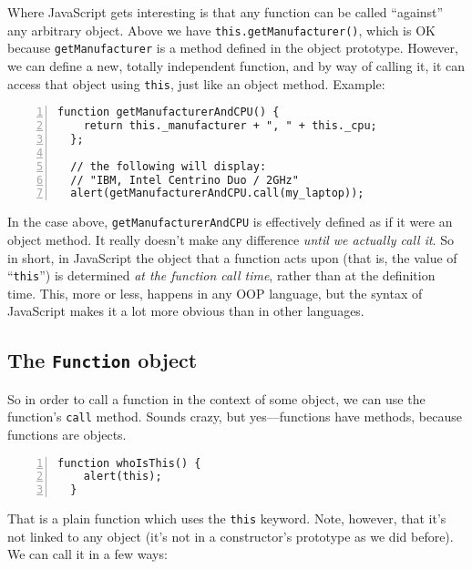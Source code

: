 Where JavaScript gets interesting is that any function can be called “against”
any arbitrary object.  Above we have \lstinline{this.getManufacturer()}, which
is OK because \lstinline{getManufacturer} is a method defined in the object
prototype.  However, we can define a new, totally independent function, and by
way of calling it, it can access that object using \lstinline{this}, just like
an object method.  Example:

\begin{lstlisting}[nolol,name=ObjectSample1,numbers=left]
  function getManufacturerAndCPU() {
    return this._manufacturer + ", " + this._cpu;
  };

  // the following will display:
  // "IBM, Intel Centrino Duo / 2GHz"
  alert(getManufacturerAndCPU.call(my_laptop));
\end{lstlisting}

In the case above, \lstinline{getManufacturerAndCPU} is effectively defined as
if it were an object method.  It really doesn't make any difference
\textit{until we actually call it}.  So in short, in JavaScript the object that
a function acts upon (that is, the value of “\lstinline{this}”) is determined
\textit{at the function call time}, rather than at the definition time.  This,
more or less, happens in any OOP language, but the syntax of JavaScript makes
it a lot more obvious than in other languages.

\subsection{The \lstinline{Function} object}\label{sec:FunctionObject}

So in order to call a function in the context of some object, we can use the
function's \lstinline{call} method.  Sounds crazy, but yes—functions have
methods, because functions are objects.

\begin{lstlisting}[nolol,name=FunctionObjectSample1,numbers=left]
  function whoIsThis() {
    alert(this);
  }
\end{lstlisting}

That is a plain function which uses the \lstinline{this} keyword.  Note,
however, that it's not linked to any object (it's not in a constructor's
prototype as we did before).  We can call it in a few ways:

